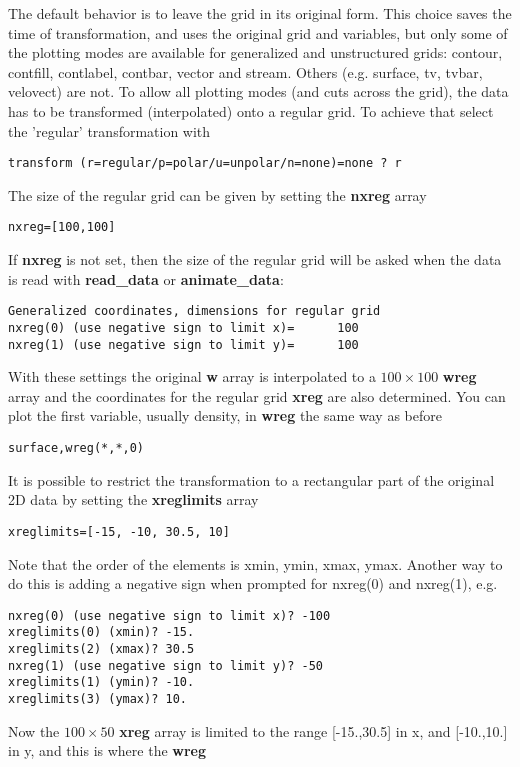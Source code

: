 \documentclass{article}
\begin{document}
   The default behavior is to leave the grid in its original form.
   This choice saves the time of transformation, and uses the original grid 
   and variables, but only some of the plotting modes are available for 
   generalized and unstructured grids: contour, contfill, contlabel, contbar,
   vector and stream. Others (e.g. surface, tv, tvbar, velovect) are not.
   To allow all plotting modes (and cuts across the grid), the data
   has to be transformed (interpolated) onto a regular grid.
   To achieve that select the 'regular' transformation with
\begin{verbatim}
transform (r=regular/p=polar/u=unpolar/n=none)=none ? r
\end{verbatim}
   The size of the regular grid can be given by setting the {\bf nxreg} array
\begin{verbatim}
nxreg=[100,100]
\end{verbatim}
   If {\bf nxreg} is not set, then  the size of the regular grid will be asked
   when the data is read with {\bf read\_data} or {\bf animate\_data}:
\begin{verbatim}
Generalized coordinates, dimensions for regular grid
nxreg(0) (use negative sign to limit x)=      100
nxreg(1) (use negative sign to limit y)=      100
\end{verbatim}
   With these settings the original {\bf w} array is interpolated to 
   a $100\times100$ {\bf wreg} array and the
   coordinates for the regular grid {\bf xreg} are also determined. 
   You can plot the first variable, usually density, in {\bf wreg} the 
   same way as before
\begin{verbatim}
surface,wreg(*,*,0)
\end{verbatim}
   It is possible to restrict the transformation to a rectangular
   part of the original 2D data by setting the {\bf xreglimits} array
\begin{verbatim}
xreglimits=[-15, -10, 30.5, 10]
\end{verbatim}
   Note that the order of the elements is xmin, ymin, xmax, ymax.
   Another way to do this is adding a negative sign when prompted for 
   nxreg(0) and nxreg(1), e.g.
\begin{verbatim}
nxreg(0) (use negative sign to limit x)? -100
xreglimits(0) (xmin)? -15.
xreglimits(2) (xmax)? 30.5
nxreg(1) (use negative sign to limit y)? -50
xreglimits(1) (ymin)? -10.
xreglimits(3) (ymax)? 10.
\end{verbatim}
   Now the $100\times 50$ {\bf xreg} array is limited to the range 
   [-15.,30.5] in x, and [-10.,10.] in y, and this is where the {\bf wreg} 
\end{document}
